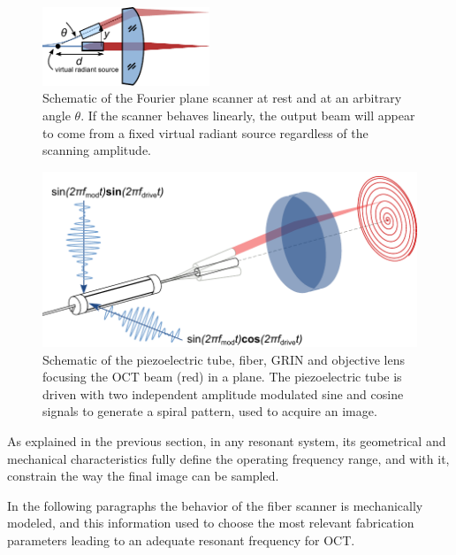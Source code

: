 \documentclass[10pt]{iopart}
\begin{document}
\begin{figure}[h!]\centering
      \includegraphics[width=5cm]{figures/radiant.pdf}
      \caption{Schematic of the Fourier plane scanner at rest and at an arbitrary angle $\theta$. If the scanner behaves linearly, the output beam will appear to come from a fixed virtual radiant source regardless of the scanning amplitude.}
      \label{fig:radiant}
\end{figure}

\begin{figure}[h!]\centering \includegraphics[width=\columnwidth]{figures/PZTDrivingMoving.pdf}
      \caption{Schematic of the piezoelectric tube, fiber, GRIN and objective lens focusing the OCT beam (red) in a plane. 
      The piezoelectric tube is driven with two independent amplitude modulated sine and cosine signals to generate a spiral pattern, used to acquire an image. }
      \label{fig:PZTDriving}
\end{figure}

As explained in the previous section, in any resonant system, its geometrical and mechanical characteristics fully define the operating frequency range, and with it, constrain the way the final image can be sampled.

In the following paragraphs the behavior of the fiber scanner is mechanically modeled, and this information used to choose the most relevant fabrication parameters leading to an adequate resonant frequency for OCT.
\end{document}
